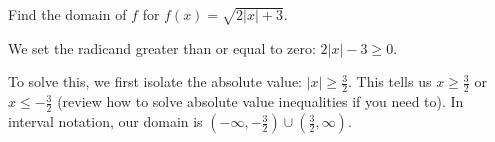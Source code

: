 \documentclass{ximera}
\begin{document}
\begin{example}
	Find the domain of $f$ for $f(x) = \sqrt{2|x| + 3}$.
		\begin{explanation}
			\begin{expandable}

We set the radicand greater than or equal to zero: $2|x| - 3 \ge 0$.

To solve this, we first isolate the absolute value: $|x| \ge \frac{3}{2}$. This tells us $x \ge \frac{3}{2}$ or $x \le -\frac{3}{2}$ (review how to solve absolute value inequalities if you need to). In interval notation, our domain is $\left(-\infty, -\frac{3}{2}\right) \cup \left(\frac{3}{2}, \infty\right)$.
			\end{expandable}
		\end{explanation}
\end{example}


\end{document}
